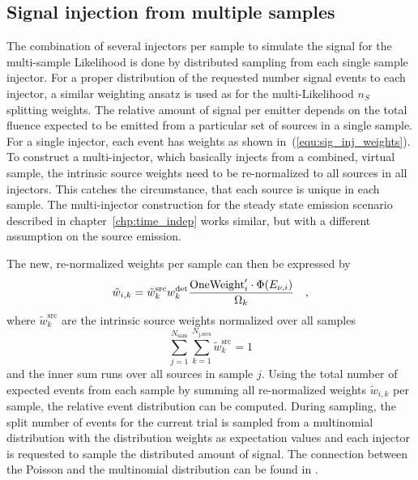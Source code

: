 \subsection{Signal injection from multiple samples}
The combination of several injectors per sample to simulate the signal for the multi-sample Likelihood is done by distributed sampling from each single sample injector.
For a proper distribution of the requested number signal events to each injector, a similar weighting ansatz is used as for the multi-Likelihood $n_S$ splitting weights.
The relative amount of signal per emitter depends on the total fluence expected to be emitted from a particular set of sources in a single sample.
For a single injector, each event has weights as shown in~(\ref{equ:sig_inj_weights}).
To construct a multi-injector, which basically injects from a combined, virtual sample, the intrinsic source weights need to be re-normalized to all sources in all injectors.
This catches the circumstance, that each source is unique in each sample.
The multi-injector construction for the steady state emission scenario described in chapter~\ref{chp:time_indep} works similar, but with a different assumption on the source emission.

The new, re-normalized weights per sample can then be expressed by
\begin{equation}
    \tilde{w}_{i,k}
    = \tilde{w}_k^\text{src} w_k^\text{det}
      \frac{\text{OneWeight}'_i \cdot \Phi(E_{\nu,i})}{\Omega_k}
  \quad\text{,}
\end{equation}
where $\tilde{w}_k^\text{src}$ are the intrinsic source weights normalized over all samples
\begin{equation}
  \sum_{j=1}^{N_\text{sam}} \sum_{k=1}^{N_\text{j,srcs}}
  \tilde{w}_k^\text{src} = 1
\end{equation}
and the inner sum runs over all sources in sample $j$.
Using the total number of expected events from each sample by summing all re-normalized weights $\tilde{w}_{i,k}$ per sample, the relative event distribution can be computed.
During sampling, the split number of events for the current trial is sampled from a multinomial distribution with the distribution weights as expectation values and each injector is requested to sample the distributed amount of signal.
The connection between the Poisson and the multinomial distribution can be found in \cite{BOHM20141}.


